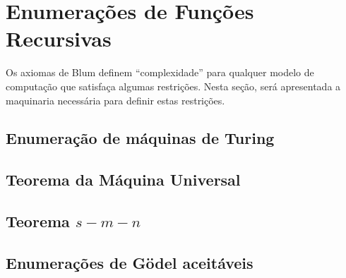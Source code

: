 \section{Enumerações de Funções Recursivas}
\label{sec:enumerations_of_recursive_functions}

Os axiomas de Blum definem ``complexidade''
para qualquer modelo de computação que satisfaça algumas restrições.
Nesta seção,
será apresentada a maquinaria necessária para definir estas restrições.

\subsection{Enumeração de máquinas de Turing}
\subsection{Teorema da Máquina Universal}
\subsection{Teorema $s-m-n$}
\subsection{Enumerações de Gödel aceitáveis}
